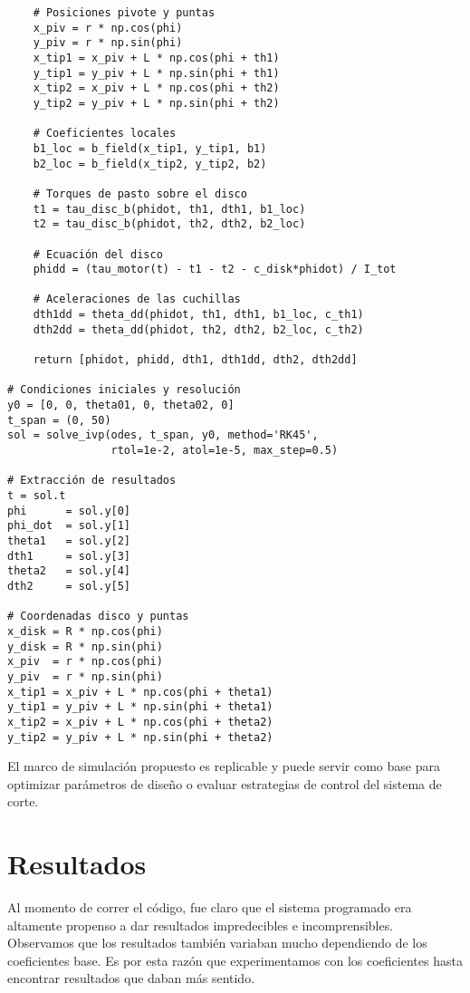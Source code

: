 \documentclass[12pt]{article}
\begin{document}
\begin{verbatim}
    # Posiciones pivote y puntas
    x_piv = r * np.cos(phi)
    y_piv = r * np.sin(phi)
    x_tip1 = x_piv + L * np.cos(phi + th1)
    y_tip1 = y_piv + L * np.sin(phi + th1)
    x_tip2 = x_piv + L * np.cos(phi + th2)
    y_tip2 = y_piv + L * np.sin(phi + th2)

    # Coeficientes locales
    b1_loc = b_field(x_tip1, y_tip1, b1)
    b2_loc = b_field(x_tip2, y_tip2, b2)

    # Torques de pasto sobre el disco
    t1 = tau_disc_b(phidot, th1, dth1, b1_loc)
    t2 = tau_disc_b(phidot, th2, dth2, b2_loc)

    # Ecuación del disco
    phidd = (tau_motor(t) - t1 - t2 - c_disk*phidot) / I_tot

    # Aceleraciones de las cuchillas
    dth1dd = theta_dd(phidot, th1, dth1, b1_loc, c_th1)
    dth2dd = theta_dd(phidot, th2, dth2, b2_loc, c_th2)

    return [phidot, phidd, dth1, dth1dd, dth2, dth2dd]

# Condiciones iniciales y resolución
y0 = [0, 0, theta01, 0, theta02, 0]
t_span = (0, 50)
sol = solve_ivp(odes, t_span, y0, method='RK45',
                rtol=1e-2, atol=1e-5, max_step=0.5)

# Extracción de resultados
t = sol.t
phi      = sol.y[0]
phi_dot  = sol.y[1]
theta1   = sol.y[2]
dth1     = sol.y[3]
theta2   = sol.y[4]
dth2     = sol.y[5]

# Coordenadas disco y puntas
x_disk = R * np.cos(phi)
y_disk = R * np.sin(phi)
x_piv  = r * np.cos(phi)
y_piv  = r * np.sin(phi)
x_tip1 = x_piv + L * np.cos(phi + theta1)
y_tip1 = y_piv + L * np.sin(phi + theta1)
x_tip2 = x_piv + L * np.cos(phi + theta2)
y_tip2 = y_piv + L * np.sin(phi + theta2)
\end{verbatim}

El marco de simulación propuesto es replicable y puede servir como base para optimizar parámetros de diseño o evaluar estrategias de control del sistema de corte. 

\section{Resultados}
Al momento de correr el código, fue claro que el sistema programado era altamente propenso a dar resultados impredecibles e incomprensibles. Observamos que los resultados también variaban mucho dependiendo de los coeficientes base. Es por esta razón que experimentamos con los coeficientes hasta encontrar resultados que daban más sentido.\\
\end{document}
